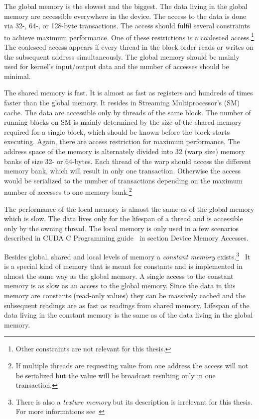 \documentclass[12pt,oneside]{fithesis2}
\begin{document}
The global memory is the slowest and the biggest. The data living in the global memory are accessible everywhere in the device. The access to the data is done via 32-, 64-, or 128-byte transactions. The access should fulfil several constraints to achieve maximum performance. One of these restrictions is a coalesced access.\footnote{Other constraints are not relevant for this thesis.} The coalesced access appears if every thread in the block order reads or writes on the subsequent address simultaneously. The global memory should be mainly used for kernel's input/output data and the number of accesses should be minimal.

The shared memory is fast. It is almost as fast as registers and hundreds of times faster than the global memory. It resides in Streaming Multiprocessor's (SM) cache. The data are accessible only by threads of the same block. The number of running blocks on SM is mainly determined by the size of the shared memory required for a single block, which should be known before the block starts executing. Again, there are access restriction for maximum performance. The address space of the memory is alternately divided into 32 (warp size) memory banks of size 32- or 64-bytes. Each thread of the warp should access the different memory bank, which will result in only one transaction. Otherwise the access would be serialized to the number of transactions depending on the maximum number of accesses to one memory bank.\footnote{If multiple threads are requesting value from one address the access will not be serialized but the value will be broadcast resulting only in one transaction.}

The performance of the local memory is almost the same as of the global memory which is slow. The data lives only for the lifespan of a thread and is accessible only by the owning thread. The local memory is only used in a few scenarios described in CUDA C Programming guide~\cite{cuda_guide} in section Device Memory Accesses.

Besides global, shared and local levels of memory a \emph{constant memory} exists.\footnote{There is also a \emph{texture memory} but its description is irrelevant for this thesis. For more informations see~\cite{cuda_guide}}~\cite{cuda_guide} It is a special kind of memory that is meant for constants and is implemented in almost the same way as the global memory. A single access to the constant memory is as slow as an access to the global memory. Since the data in this memory are constants (read-only values) they can be massively cached and the subsequent readings are as fast as readings from shared memory. Lifespan of the data living in the constant memory is the same as of the data living in the global memory.
\end{document}

